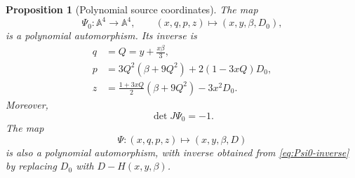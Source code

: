 \documentclass[11pt]{article}
\newcommand{\Aff}{\mathbb A}
\newtheorem{proposition}[theorem]{Proposition}
\theoremstyle{remark}
\begin{document}
\begin{proposition}[Polynomial source coordinates]\label{prop:source-automorphism}
The map
\begin{equation}\label{eq:Psi0-def}
  \Psi_0:\Aff^4\longrightarrow\Aff^4,
  \qquad
  (x,q,p,z)\longmapsto(x,y,\beta,D_0),
\end{equation}
is a polynomial automorphism.  Its inverse is
\begin{equation}\label{eq:Psi0-inverse}
\begin{split}
  q&=Q=y+\frac{x\beta}{3},\\
  p&=3Q^2(\beta+9Q^2)+2(1-3xQ)D_0,\\
  z&=\frac{1+3xQ}{2}(\beta+9Q^2)-3x^2D_0.
\end{split}
\end{equation}
Moreover,
\begin{equation}\label{eq:Psi0-det}
  \det J\Psi_0=-1.
\end{equation}
The map
\begin{equation}\label{eq:Psi-def}
  \Psi:(x,q,p,z)\longmapsto(x,y,\beta,D)
\end{equation}
is also a polynomial automorphism, with inverse obtained from
\eqref{eq:Psi0-inverse} by replacing \(D_0\) with \(D-H(x,y,\beta)\).
\end{proposition}
\end{document}
